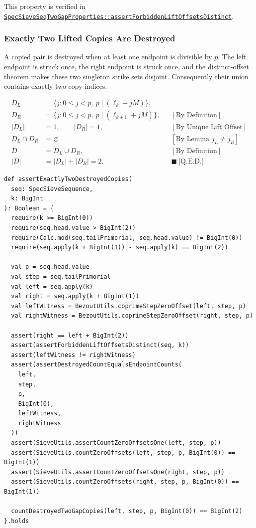 {\raggedright
This property is verified in
\href{https://github.com/thiagomata/prime-numbers/blob/master/src/main/scala/v1/chapter6/sieve/seq/spec/properties/SpecSieveSeqTwoGapProperties.scala}{\texttt{SpecSieveSeqTwoGapProperties::assertForbiddenLiftOffsetsDistinct}}.
\par}

\subsubsection{Exactly Two Lifted Copies Are Destroyed}
\label{sec:exactly-two-lifted-copies-destroyed}

A copied pair is destroyed when at least one endpoint is divisible by
$p$. The left endpoint is struck once, the right endpoint is struck once,
and the distinct-offset theorem makes these two singleton strike sets
disjoint. Consequently their union contains exactly two copy indices.

\begin{equation*}
\begin{aligned}
D_L&=\{j:0\le j\lt p,\ p\mid(\ell_k+jM)\},\\
D_R&=\{j:0\le j\lt p,\ p\mid(\ell_{k+1}+jM)\},
&&[\text{By Definition}]\\
|D_L|&=1,
\qquad |D_R|=1,
&&[\text{By Unique Lift Offset}]\\
D_L\cap D_R&=\varnothing
&&[\text{By Lemma }j_L\ne j_R]\\
D&=D_L\cup D_R,
&&[\text{By Definition}]\\
|D|&=|D_L|+|D_R|=2.
&&\blacksquare\ \text{[Q.E.D.]}
\end{aligned}
\end{equation*}

\begin{lstlisting}[style=scala]
def assertExactlyTwoDestroyedCopies(
  seq: SpecSieveSequence,
  k: BigInt
): Boolean = {
  require(k >= BigInt(0))
  require(seq.head.value > BigInt(2))
  require(Calc.mod(seq.tailPrimorial, seq.head.value) != BigInt(0))
  require(seq.apply(k + BigInt(1)) - seq.apply(k) == BigInt(2))

  val p = seq.head.value
  val step = seq.tailPrimorial
  val left = seq.apply(k)
  val right = seq.apply(k + BigInt(1))
  val leftWitness = BezoutUtils.coprimeStepZeroOffset(left, step, p)
  val rightWitness = BezoutUtils.coprimeStepZeroOffset(right, step, p)

  assert(right == left + BigInt(2))
  assert(assertForbiddenLiftOffsetsDistinct(seq, k))
  assert(leftWitness != rightWitness)
  assert(assertDestroyedCountEqualsEndpointCounts(
    left,
    step,
    p,
    BigInt(0),
    leftWitness,
    rightWitness
  ))
  assert(SieveUtils.assertCountZeroOffsetsOne(left, step, p))
  assert(SieveUtils.countZeroOffsets(left, step, p, BigInt(0)) == BigInt(1))
  assert(SieveUtils.assertCountZeroOffsetsOne(right, step, p))
  assert(SieveUtils.countZeroOffsets(right, step, p, BigInt(0)) == BigInt(1))

  countDestroyedTwoGapCopies(left, step, p, BigInt(0)) == BigInt(2)
}.holds
\end{lstlisting}

